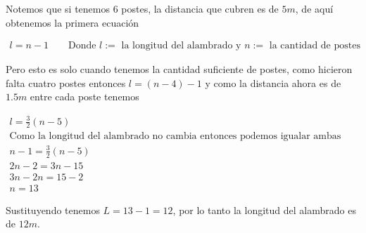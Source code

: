 Notemos que si tenemos 6 postes, la distancia que cubren es de $5m$, de aquí obtenemos la primera ecuación

\begin{gather*}
    l = n-1 \qquad \text{Donde $l:=$ la longitud del alambrado y $n:=$ la cantidad de postes}
\end{gather*}

Pero esto es solo cuando tenemos la cantidad suficiente de postes, como hicieron falta cuatro postes entonces $l = (n-4)-1$ y como la distancia ahora es de $1.5m$ entre cada poste tenemos

\begin{gather*}
    l = \frac{3}{2}(n-5) \\
    \text{Como la longitud del alambrado no cambia entonces podemos igualar ambas ecuaciones}\\
    n-1 = \frac{3}{2}(n-5) \\
    2n-2 = 3n - 15\\
    3n - 2n = 15 -2\\
    n = 13
\end{gather*}

Sustituyendo tenemos $L = 13-1 = 12$, por lo tanto la longitud del alambrado es de $12m$.